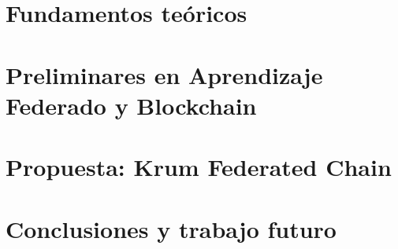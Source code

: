 \documentclass[oneside,openright,titlepage,numbers=noenddot,openany,headinclude,footinclude=true,
cleardoublepage=empty,abstractoff,BCOR=5mm,paper=a4,fontsize=12pt,main=spanish]{scrreprt}
\begin{document}





\part{Fundamentos teóricos}\label{sec:preliminares}
 

 

 
 
 
 

\part{Preliminares en Aprendizaje Federado y Blockchain}\label{sec:fundamentosAaBl}



\part{Propuesta: Krum Federated Chain}\label{sec:kfc}


 
 



 


\part{Conclusiones y trabajo futuro}






\end{document}
